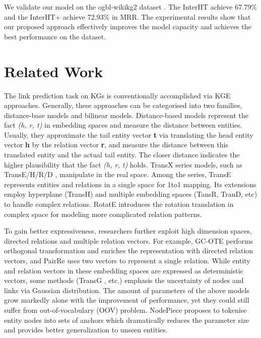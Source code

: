 \documentclass[11pt]{article}
\begin{document}
We validate our model on the ogbl-wikikg2 dataset \cite{hu2020open}. The InterHT achieve 67.79\% and the InterHT+ achieve 72.93\% in MRR. The experimental results show that our proposed approach effectively improves the model capacity and achieves the best performance on the dataset.

\section{Related Work}
The link prediction task on KGs is conventionally accomplished via KGE approaches. Generally, these approaches can be categorised into two families, distance-base models and bilinear models. Distance-based models represent the fact \emph{(h, r, t)} in embedding spaces and measure the distance between entities. Usually, they approximate the tail entity vector \textbf{t} via translating the head entity vector \textbf{h} by the relation vector \textbf{r}, and measure the distance between this translated entity and the actual tail entity. The closer distance indicates the higher plausibility that the fact \emph{(h, r, t)} holds. TransX series models, such as TransE/H/R/D \cite{bordes2013translating,wang2014knowledge,lin2015learning,ji2015knowledge}, manipulate in the real space. Among the series, TransE represents entities and relations in a single space for 1to1 mapping. Its extensions employ hyperplane (TransH) and multiple embedding spaces (TansR, TranD, etc) to handle complex relations. RotatE \cite{sun2019rotate} introduces the rotation translation in complex space for modeling more complicated relation patterns. 

To gain better expressiveness, researchers further exploit high dimension spaces, directed relations and multiple relation vectors. For example, GC-OTE \cite{tang2019orthogonal} performs orthogonal transformation and enriches the representation with directed relation vectors, and PairRe \cite{chao2020pairre} uses two vectors to represent a single relation. While entity and relation vectors in these embedding spaces are expressed as deterministic vectors, some methods (TransG \cite{xiao2015transg}, etc.) emphasis the uncertainty of nodes and links via Gaussian distribution. The amount of parameters of the above models grow markedly alone with the improvement of performance, yet they could still suffer from out-of-vocabulary (OOV) problem. NodePiece \cite{galkin2021nodepiece} proposes to tokenise entity nodes into sets of anchors which dramatically reduces the parameter size and provides better generalization to unseen entities.
\end{document}

